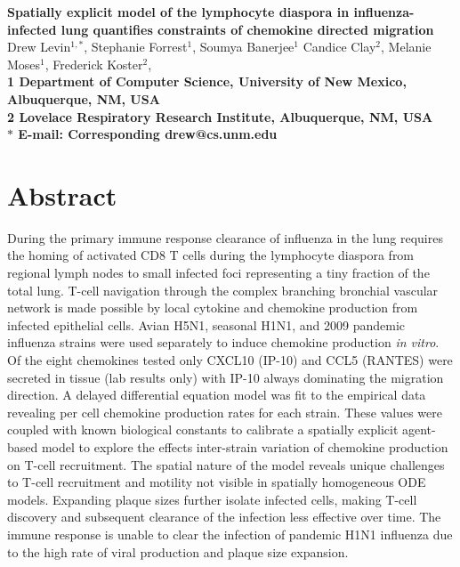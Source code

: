 \documentclass[10pt]{article}
\date{}
\begin{document}
\begin{flushleft}
{\Large
\textbf{Spatially explicit model of the lymphocyte diaspora in influenza-infected lung quantifies constraints of chemokine directed migration}
}
\\
Drew Levin$^{1,\ast}$, 
Stephanie Forrest$^{1}$, 
Soumya Banerjee$^{1}$
Candice Clay$^{2}$, 
Melanie Moses$^{1}$, 
Frederick Koster$^{2}$, 
\\
\bf{1} Department of Computer Science, University of New Mexico, Albuquerque, NM, USA
\\
\bf{2} Lovelace Respiratory Research Institute, Albuquerque, NM, USA
\\
$\ast$ E-mail: Corresponding drew@cs.unm.edu
\end{flushleft}



\section*{Abstract}

During the primary immune response clearance of influenza in the lung requires the homing of activated CD8 T cells during the lymphocyte diaspora from regional lymph nodes to small infected foci representing a tiny fraction of the total lung.  T-cell navigation through the complex branching bronchial vascular network is made possible by local cytokine and chemokine production from infected epithelial cells.  Avian H5N1, seasonal H1N1, and 2009 pandemic influenza strains were used separately to induce chemokine production \textit{in vitro}.  Of the eight chemokines tested only CXCL10 (IP-10) and CCL5 (RANTES) were secreted in tissue  (lab results only) with IP-10 always dominating the migration direction.  A delayed differential equation model was fit to the empirical data revealing per cell chemokine production rates for each strain.  These values were coupled with known biological constants to calibrate a spatially explicit agent-based model to explore the effects inter-strain variation of chemokine production on T-cell recruitment.  The spatial nature of the model reveals unique challenges to T-cell recruitment and motility not visible in spatially homogeneous ODE models.  Expanding plaque sizes further isolate infected cells, making T-cell discovery and subsequent clearance of the infection less effective over time.  The immune response is unable to clear the infection of pandemic H1N1 influenza due to the high rate of viral production and plaque size expansion.
\end{document}
